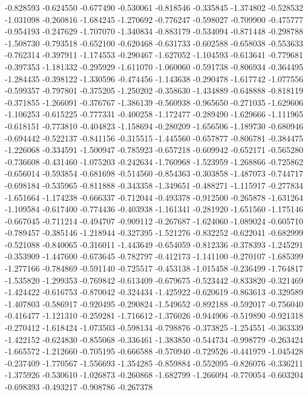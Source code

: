 -0.828593
-0.624550
-0.677490
-0.530061
-0.818546
-0.335845
-1.374802
-0.528532
-1.031098
-0.260816
-1.684245
-1.270692
-0.776247
-0.598027
-0.709900
-0.475777
-0.954193
-0.247629
-1.707070
-1.340834
-0.883179
-0.534094
-0.871448
-0.298788
-1.508730
-0.793518
-0.652100
-0.620468
-0.631733
-0.602588
-0.658038
-0.553633
-0.762314
-0.397911
-1.174553
-0.290467
-1.627052
-1.104593
-0.613641
-0.779681
-0.397353
-1.181332
-0.295929
-1.611070
-1.060060
-0.591738
-0.806934
-0.364495
-1.284435
-0.398122
-1.330596
-0.474456
-1.143638
-0.290478
-1.617742
-1.077556
-0.599357
-0.797801
-0.375205
-1.250202
-0.358630
-1.434889
-0.648888
-0.818119
-0.371855
-1.266091
-0.376767
-1.386139
-0.560938
-0.965650
-0.271035
-1.629606
-1.106253
-0.615225
-0.777331
-0.400258
-1.172477
-0.289490
-1.629666
-1.111965
-0.618151
-0.773810
-0.404823
-1.158694
-0.280209
-1.656506
-1.189730
-0.680946
-0.694442
-0.522137
-0.841156
-0.315515
-1.445560
-0.657877
-0.806781
-0.384475
-1.226068
-0.334591
-1.500947
-0.785923
-0.657218
-0.609942
-0.652171
-0.565280
-0.736608
-0.431460
-1.075203
-0.242634
-1.760968
-1.523959
-1.268866
-0.725862
-0.656014
-0.593854
-0.681698
-0.514560
-0.854363
-0.303858
-1.487073
-0.744717
-0.698184
-0.535965
-0.811888
-0.343358
-1.349651
-0.488271
-1.115917
-0.277834
-1.651664
-1.174238
-0.666337
-0.712044
-0.493378
-0.912500
-0.265878
-1.631264
-1.109584
-0.617400
-0.774436
-0.403938
-1.161341
-0.281920
-1.651560
-1.175146
-0.667045
-0.711214
-0.494707
-0.909112
-0.267687
-1.624060
-1.089024
-0.605710
-0.789457
-0.385146
-1.218944
-0.327395
-1.521276
-0.832252
-0.622041
-0.682999
-0.521088
-0.840065
-0.316011
-1.443649
-0.654059
-0.812336
-0.378393
-1.245291
-0.353909
-1.447600
-0.673645
-0.782797
-0.412173
-1.141100
-0.270107
-1.685399
-1.277166
-0.784869
-0.591140
-0.725517
-0.453138
-1.015458
-0.236499
-1.764817
-1.535820
-1.299353
-0.769842
-0.613409
-0.679675
-0.523442
-0.833820
-0.321469
-1.424422
-0.616753
-0.870042
-0.324434
-1.425922
-0.620619
-0.863613
-0.329589
-1.407803
-0.586917
-0.920495
-0.290824
-1.549652
-0.892188
-0.592017
-0.756040
-0.416477
-1.121310
-0.259281
-1.716612
-1.376026
-0.944906
-0.519890
-0.921318
-0.270412
-1.618424
-1.073503
-0.598134
-0.798876
-0.373825
-1.254551
-0.363339
-1.422152
-0.624830
-0.855068
-0.336461
-1.383850
-0.544734
-0.998779
-0.263424
-1.665572
-1.212660
-0.705195
-0.666588
-0.570940
-0.729526
-0.441979
-1.045428
-0.237409
-1.770567
-1.556693
-1.354285
-0.859884
-0.552095
-0.826076
-0.336211
-1.375926
-0.530610
-1.026873
-0.260868
-1.682799
-1.266094
-0.770054
-0.603204
-0.698393
-0.493217
-0.908786
-0.267378
